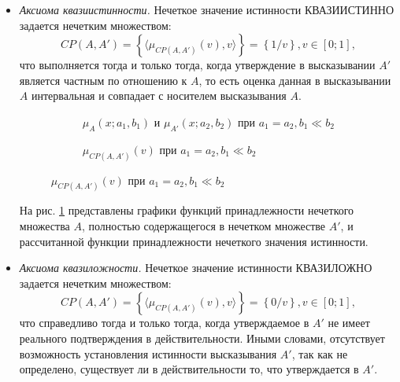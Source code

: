 \begin{itemize}
\item \textit{Аксиома квазиистинности.} Нечеткое значение истинности КВАЗИИСТИННО задается нечетким множеством:
\begin{equation*} 
CP(A,A') = \left\{\langle\mu_{CP(A,A')}(v), v\rangle\right\} = \left\{1/v\right\}, v \in [0; 1],
\end{equation*}
что выполняется тогда и только тогда, когда утверждение в высказывании $A'$ является частным по отношению к $A$, то есть оценка данная в высказывании $A$ интервальная и совпадает с носителем высказывания $A$.

\begin{figure}[ht]
	\newcommand{\aOne}{0.5}
	\newcommand{\bOne}{0.05}
	\newcommand{\aTwo}{0.5}
	\newcommand{\bTwo}{0.05}
	\begin{subfigure}[t]{0.5\textwidth}
		\caption{$\mu_A(x; a_1, b_1)$ и $\mu_{A'}(x; a_2, b_2)$ при $a_1 = a_2, b_1 \ll b_2$}
	\end{subfigure}
	\begin{subfigure}[t]{0.5\textwidth}
		\caption{$\mu_{CP(A,A')}(v)$ при $a_1 = a_2, b_1 \ll b_2$}
	\end{subfigure}
	\label{fig:ftv-gauss-quazi-true}
\end{figure}

На рис. \cref{fig:ftv-gauss-quazi-true} представлены графики функций принадлежности нечеткого множества $A$, полностью содержащегося в нечетком множестве $A'$, и рассчитанной функции принадлежности нечеткого значения истинности.

\item \textit{Аксиома квазиложности.} Нечеткое значение истинности КВАЗИЛОЖНО задается нечетким множеством:
\begin{equation*} 
CP(A,A') = \left\{\langle\mu_{CP(A,A')}(v), v\rangle\right\} = \left\{0/v\right\}, v \in [0; 1],
\end{equation*}
что справедливо тогда и только тогда, когда утверждаемое в $A'$ не имеет реального подтверждения в действительности. Иными словами, отсутствует возможность установления истинности высказывания $A'$, так как не определено, существует ли в действительности то, что утверждается в $A'$.


\end{itemize}
